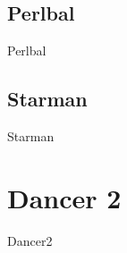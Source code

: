\subsection{Perlbal}
\begin{frame}{Perlbal}
\end{frame}

\subsection{Starman}
\begin{frame}{Starman}
\end{frame}

\section{Dancer 2}
\begin{frame}{Dancer2}
\end{frame}



